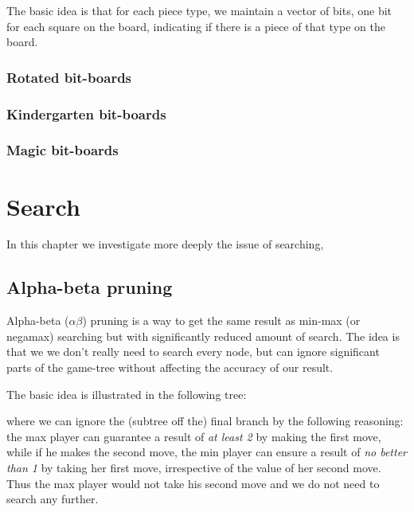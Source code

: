 \documentclass[10pt,dvipdfmx]{report}
\newcommand{\ab}{{$\alpha\beta$}}
\begin{document}
The basic idea is that for each piece type, we maintain a vector of bits, one bit
for each square on the board, indicating if there is a piece of that type on the
board.

\subsection{Rotated bit-boards}
\subsection{Kindergarten bit-boards}
\subsection{Magic bit-boards}


\chapter{Search}
\label{chap-search}

In this chapter we investigate more deeply the issue of searching,

\section{Alpha-beta pruning}
Alpha-beta (\ab) pruning is a way to get the same result
as min-max (or negamax) searching but with significantly reduced amount of search.
The idea is that we we don't really need to search every node, but can ignore significant
parts of the game-tree without affecting the accuracy of our result.

The basic idea is illustrated in the following tree:
\begin{center}
\end{center}
where we can ignore the (subtree off the) final branch by the following reasoning:
the max player can guarantee a result of {\em at least 2} by making the first move, while if
he makes the second move, the min player can ensure a result of {\em no better than 1} by taking
her first move, irrespective of the value of her second move.  Thus the max player would not take
his second move and we do not need to search any further.
\end{document}
